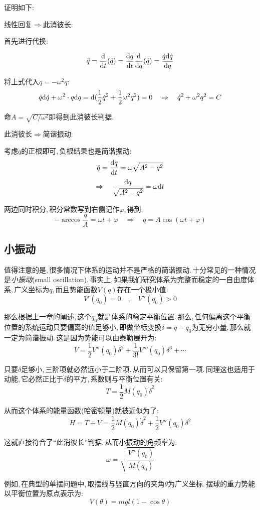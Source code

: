 证明如下:

线性回复$\Rightarrow$此消彼长:

首先进行代换:

\[\ddot{q}=\frac{\textrm{d}}{\textrm{d} t}(\dot{q})=\frac{\textrm{d} q}{\textrm{d} t}\frac{\textrm{d}}{\textrm{d} q}(\dot{q})=\frac{\dot{q}\textrm{d}\dot{q}}{\textrm{d} q}\]

将上式代入$\ddot{q}=-\omega^2 q$:
\[\dot{q}\textrm{d}\dot{q}+\omega^2 \cdot q\textrm{d} q=\textrm{d}(\frac{1}{2}\dot{q}^2+\frac{1}{2}\omega^2 q^2)=0\quad \Rightarrow \quad \dot{q}^2+\omega^2 q^2=C\]

命$A=\sqrt{C/\omega^2}$即得到此消彼长判据.

此消彼长$\Rightarrow$简谐振动:

考虑$\dot{q}$的正根即可,\,负根结果也是简谐振动:
\[\dot{q}=\frac{\textrm{d} q}{\textrm{d} t}=\omega\sqrt{A^2-q^2}\]
\[\Rightarrow \quad \frac{\textrm{d} q}{\sqrt{A^2-q^2}}=\omega \textrm{d} t\]

两边同时积分,\,积分常数写到右侧记作$\varphi$,\,得到:
\[-\arccos \frac{q}{A}=\omega t+\varphi \quad \Rightarrow\quad q=A\cos(\omega t+\varphi)\]
\vspace{-0.1cm}


\subsection{小振动}

值得注意的是,\,很多情况下体系的运动并不是严格的简谐振动.\,十分常见的一种情况是\emph{小振动}(small oscillation).\,事实上,\,如果我们研究体系为完整而稳定的一自由度体系,\,广义坐标为$q$,\,而且势能函数$V(q)$存在一个极小值:
\[V'(q_0)=0\quad,\quad V''(q_0)>0\]

那么根据上一章的阐述,\,这个$q_0$就是体系的稳定平衡位置.\,那么,\,任何偏离这个平衡位置的系统运动只要偏离的值足够小,\,即做坐标变换$\delta=q-q_0$为无穷小量,\,那么就一定为简谐振动.\,这是因为势能可以由泰勒展开为:
\[V=\frac{1}{2}V''(q_0)\delta^2+\frac{1}{3!}V'''(q_0)\delta^3+\cdots\]

只要$\delta$足够小,\,三阶项就必然远小于二阶项.\,从而可以只保留第一项.\,同理这也适用于动能,\,它必然正比于$\dot{\delta}$的平方,\,系数则与平衡位置有关:
\[T=\frac{1}{2}M(q_0)\dot{\delta}^2\]

从而这个体系的能量函数(哈密顿量)就被近似为了:
\[H=T+V=\frac{1}{2}M(q_0)\dot{\delta}^2+\frac{1}{2}V''(q_0)\delta^2\]

这就直接符合了``此消彼长''判据.\,从而小振动的角频率为:
\[\omega=\sqrt{\frac{V''(q_0)}{M(q_0)}}\]

例如,\,在典型的单摆问题中,\,取摆线与竖直方向的夹角$\theta$为广义坐标.\,摆球的重力势能以平衡位置为原点表示为:
\[V(\theta)=mgl(1-\cos\theta)\]


